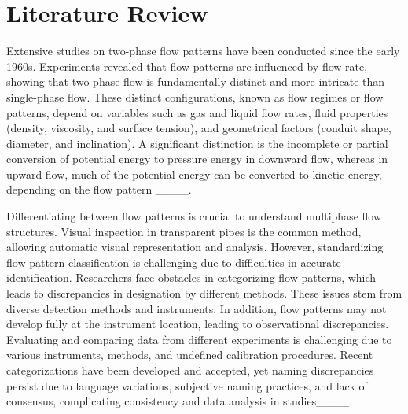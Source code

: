 \section{Literature Review}
\label{LitReview}
Extensive studies on two-phase flow patterns have been conducted since the early 1960s. Experiments revealed that flow patterns are influenced by flow rate, showing that two-phase flow is fundamentally distinct and more intricate than single-phase flow. These distinct configurations, known as flow regimes or flow patterns, depend on variables such as gas and liquid flow rates, fluid properties (density, viscosity, and surface tension), and geometrical factors (conduit shape, diameter, and inclination). A significant distinction is the incomplete or partial conversion of potential energy to pressure energy in downward flow, whereas in upward flow, much of the potential energy can be converted to kinetic energy, depending on the flow pattern ____.

Differentiating between flow patterns is crucial to understand multiphase flow structures. Visual inspection in transparent pipes is the common method, allowing automatic visual representation and analysis. However, standardizing flow pattern classification is challenging due to difficulties in accurate identification. Researchers face obstacles in categorizing flow patterns, which leads to discrepancies in designation by different methods. These issues stem from diverse detection methods and instruments. In addition, flow patterns may not develop fully at the instrument location, leading to observational discrepancies. Evaluating and comparing data from different experiments is challenging due to various instruments, methods, and undefined calibration procedures. Recent categorizations have been developed and accepted, yet naming discrepancies persist due to language variations, subjective naming practices, and lack of consensus, complicating consistency and data analysis in studies____.

